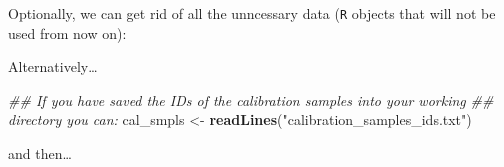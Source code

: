 \documentclass[]{book}
\newenvironment{Shaded}{\begin{snugshade}}{\end{snugshade}}
\newcommand{\CommentTok}[1]{\textcolor[rgb]{0.56,0.35,0.01}{\textit{#1}}}
\newcommand{\DataTypeTok}[1]{\textcolor[rgb]{0.13,0.29,0.53}{#1}}
\newcommand{\KeywordTok}[1]{\textcolor[rgb]{0.13,0.29,0.53}{\textbf{#1}}}
\newcommand{\NormalTok}[1]{#1}
\newcommand{\OperatorTok}[1]{\textcolor[rgb]{0.81,0.36,0.00}{\textbf{#1}}}
\newcommand{\StringTok}[1]{\textcolor[rgb]{0.31,0.60,0.02}{#1}}
\begin{document}
Optionally, we can get rid of all the unncessary data (\texttt{R} objects that will not be used from now on):

\begin{Shaded}
\end{Shaded}

Alternatively\ldots{}

\begin{Shaded}
\begin{Highlighting}[]
\CommentTok{## If you have saved the IDs of the calibration samples into your working}
\CommentTok{## directory you can:}
\NormalTok{cal_smpls <-}\StringTok{ }\KeywordTok{readLines}\NormalTok{(}\StringTok{"calibration_samples_ids.txt"}\NormalTok{)}
\end{Highlighting}
\end{Shaded}

and then\ldots{}
\end{document}
